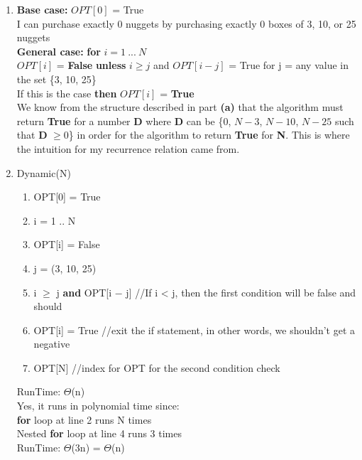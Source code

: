 \documentclass[11pt,twoside]{article}
\begin{document}
\begin{enumerate}[leftmargin=0pt,label=(\alph*)]
\item {\bf Base case:} $OPT[0]$ = True\\
I can purchase exactly $0$ nuggets by purchasing exactly $0$ boxes of 3, 10, or 25 nuggets\\
{\bf General case:} {\bf for} $i = 1\ ...\ N$\\
$OPT[i]$ = {\bf False}\hspace{2mm} {\bf unless} \hspace{2mm}$i\geq j$ and $OPT[i-j]$ = True \hspace{2mm} for j = any value in the set \{3, 10, 25\}\\ If this is the case {\bf then} $OPT[i]$ = {\bf True}\\
We know from the structure described in part {\bf (a)} that the algorithm must return {\bf True} for a number {\bf D} where {\bf D} can be \{$0$, $N-3$, $N-10$, $N-25$ such that {\bf D} $\geq0$\} in order for the algorithm to return {\bf True} for {\bf N}. This is where the intuition for my recurrence relation came from.

\item Dynamic(N)
\begin{enumerate}[leftmargin=10pt,label=\arabic*]
\item OPT[0] = True
\item \hspace{2mm}{\bf for} i = 1 .. N
\item \hspace{2mm}\hspace{5mm}OPT[i] = False
\item \hspace{2mm}\hspace{5mm}{\bf for} j = (3, 10, 25)
\item \hspace{2mm}\hspace{5mm}\hspace{5mm}{\bf if} i $\geq$ j {\bf and} OPT[i $-$ j] \hspace{10mm}//If i < j, then the first condition will be false and should
\item \hspace{2mm}\hspace{5mm}\hspace{5mm}\hspace{5mm}OPT[i] = True \hspace{10mm}//exit the if statement, in other words, we shouldn't get a negative
\item \hspace{2mm}{\bf return} OPT[N] \hspace{20mm}//index for OPT for the second condition check
\end{enumerate}
RunTime: $\Theta$(n)\\
Yes, it runs in polynomial time since:\\
{\bf for} loop at line 2 runs N times\\
Nested {\bf for} loop at line 4 runs 3 times\\
RunTime: $\Theta$(3n) = $\Theta$(n)\\


\end{enumerate}
\end{document}
